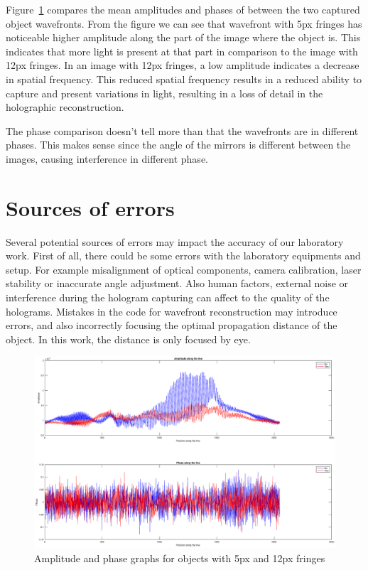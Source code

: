 \documentclass[12pt,a4paper,english
]{tunithesis}
\begin{document}
Figure~\ref{fig:lines} compares the mean amplitudes and phases of between the two captured object wavefronts. From the figure we can see that wavefront with 5px fringes has noticeable higher amplitude along the part of the image where the object is. This indicates that more light is present at that part in comparison to the image with 12px fringes. In an image with 12px fringes, a low amplitude indicates a decrease in spatial frequency. This reduced spatial frequency results in a reduced ability to capture and present variations in light, resulting in a loss of detail in the holographic reconstruction. ~\cite{holography}

The phase comparison doesn't tell more than that the wavefronts are in different phases. This makes sense since the angle of the mirrors is different between the images, causing interference in different phase.

\section{Sources of errors}
Several potential sources of errors may impact the accuracy of our laboratory work. First of all, there could be some errors with the laboratory equipments and setup. For example misalignment of optical components, camera calibration, laser stability or inaccurate angle adjustment. Also human factors, external noise or interference during the hologram capturing can affect to the quality of the holograms. Mistakes in the code for wavefront reconstruction may introduce errors, and also incorrectly focusing the optimal propagation distance of the object. In this work, the distance is only focused by eye.

\begin{figure}
  \centering
  \includegraphics[width=\columnwidth]{img/lines.eps}
  \caption{Amplitude and phase graphs for objects with 5px and 12px fringes}
  \label{fig:lines}
\end{figure}
\end{document}
